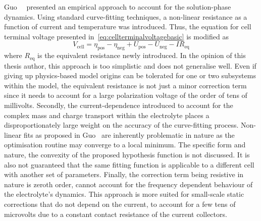 Guo~\etal~\cite{Guo2011a}  presented an  empirical approach  to account  for the
solution-phase dynamics.  Using standard curve-fitting techniques,  a non-linear
resistance as  a function of current  and temperature was introduced.  Thus, the
equation for cell terminal voltage presented
in~\cref{eq:cellterminalvoltagebasic} is modified as
\begin{equation}
    V_\text{cell} = η_\text{pos} - η_\text{neg} + U_\text{pos} - U_\text{neg} - I R_\text{eq}
\end{equation}
where  $R_\text{eq}$  is the  equivalent  resistance  newly introduced.  In  the
opinion of  this thesis  author, this  approach is too  simplistic and  does not
generalise well. Even if giving up  physics-based model origins can be tolerated
for one  or two subsystems  within the model,  the equivalent resistance  is not
just a minor correction term since it  needs to account for a large polarization
voltage of  the order  of tens of  millivolts. Secondly,  the current-dependence
introduced  to account  for the  complex mass  and charge  transport within  the
electrolyte  places a  disproportionately large  weight on  the accuracy  of the
curve-fitting process. Non-linear fits as proposed in Guo~\etal{} are inherently
problematic  in nature  as  the optimisation  routine may  converge  to a  local
minimum.  The specific  form and  nature, \eg{}  the convexity  of the  proposed
hypothesis function  is not discussed. It  is also not guaranteed  that the same
fitting  function  is  applicable  to  a different  cell  with  another  set  of
parameters. Finally,  the correction  term being resistive  in nature  is zeroth
order,  \ie{}  cannot account  for  the  frequency  dependent behaviour  of  the
electrolyte's  dynamics. This  approach is  more suited  for small-scale  static
corrections that do not depend on the current,\eg{} to account for a few tens of
microvolts  due to  a constant  contact  resistance of  the current  collectors.

